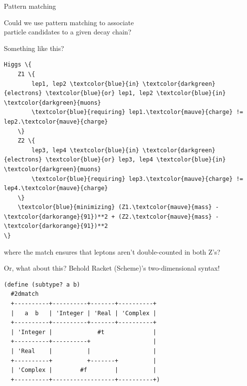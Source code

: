\documentclass[aspectratio=169]{beamer}
\begin{document}
\begin{frame}{Pattern matching}
\LARGE
\vspace{0.5 cm}
\begin{center}
Could we use pattern matching to associate \\ particle candidates to a given decay chain?
\end{center}
\end{frame}

\begin{frame}[fragile]{Something like this?}
\begin{Verbatim}[commandchars=\\\{\}]
Higgs \{
    Z1 \{
        lep1, lep2 \textcolor{blue}{in} \textcolor{darkgreen}{electrons} \textcolor{blue}{or} lep1, lep2 \textcolor{blue}{in} \textcolor{darkgreen}{muons}
        \textcolor{blue}{requiring} lep1.\textcolor{mauve}{charge} != lep2.\textcolor{mauve}{charge}
    \}
    Z2 \{
        lep3, lep4 \textcolor{blue}{in} \textcolor{darkgreen}{electrons} \textcolor{blue}{or} lep3, lep4 \textcolor{blue}{in} \textcolor{darkgreen}{muons}
        \textcolor{blue}{requiring} lep3.\textcolor{mauve}{charge} != lep4.\textcolor{mauve}{charge}
    \}
    \textcolor{blue}{minimizing} (Z1.\textcolor{mauve}{mass} - \textcolor{darkorange}{91})**2 + (Z2.\textcolor{mauve}{mass} - \textcolor{darkorange}{91})**2
\}
\end{Verbatim}

\large
\vspace{0.5 cm}
where the match ensures that leptons aren't double-counted in both Z's?
\end{frame}

\begin{frame}[fragile]{Or, what about this?}
\Large
\vspace{0.5 cm}
Behold Racket (Scheme)'s two-dimensional syntax!

\normalsize

\vspace{0.25 cm}
\begin{verbatim}
(define (subtype? a b)
  #2dmatch
  +----------+----------+-------+----------+
  |   a  b   | 'Integer | 'Real | 'Complex |
  +----------+----------+-------+----------+
  | 'Integer |             #t              |
  +----------+----------+                  |
  | 'Real    |          |                  |
  +----------+          +-------+          |
  | 'Complex |        #f        |          |
  +----------+------------------+----------+)
\end{verbatim}
\end{frame}
\end{document}
